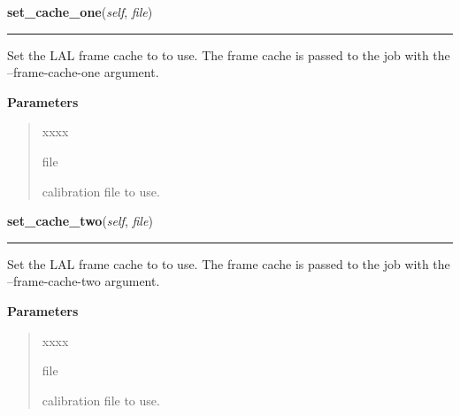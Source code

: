     \begin{boxedminipage}{\textwidth}

    \raggedright \textbf{set\_cache\_one}(\textit{self}, \textit{file})

    \vspace{-1.5ex}

    \rule{\textwidth}{0.5\fboxrule}
    Set the LAL frame cache to to use. The frame cache is passed to the 
    job with the --frame-cache-one argument.

    \vspace{1ex}

      \textbf{Parameters}
      \begin{quote}
        \begin{Ventry}{xxxx}

          \item[file]

          calibration file to use.

        \end{Ventry}

      \end{quote}

    \vspace{1ex}

    \end{boxedminipage}

    \label{stochastic:StochasticNode:set_cache_two}
    \vspace{0.5ex}

    \begin{boxedminipage}{\textwidth}

    \raggedright \textbf{set\_cache\_two}(\textit{self}, \textit{file})

    \vspace{-1.5ex}

    \rule{\textwidth}{0.5\fboxrule}
    Set the LAL frame cache to to use. The frame cache is passed to the 
    job with the --frame-cache-two argument.

    \vspace{1ex}

      \textbf{Parameters}
      \begin{quote}
        \begin{Ventry}{xxxx}

          \item[file]

          calibration file to use.

        \end{Ventry}

      \end{quote}

    \vspace{1ex}

    \end{boxedminipage}

